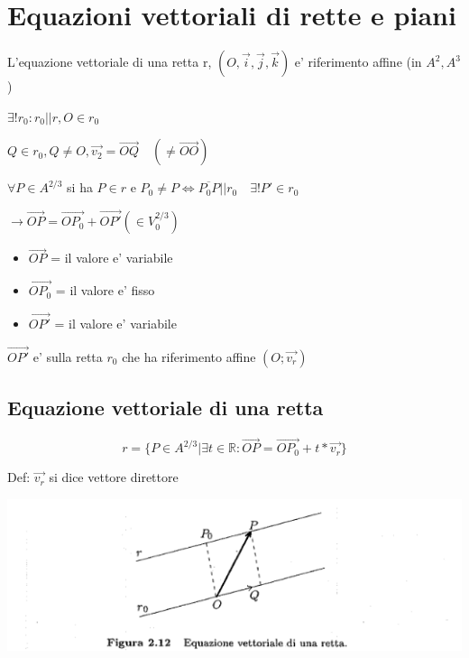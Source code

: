\documentclass{article}
\begin{document}
\section{Equazioni vettoriali di rette e piani}
\begin{flushleft}
	L'equazione vettoriale di una retta r,
	$(O,\overrightarrow{i},\overrightarrow{j},\overrightarrow{k})$ e' riferimento affine (in $A^2,A^3$)
\end{flushleft}
\begin{flushleft}
	$\exists ! r_0 : r_0 || r, O \in r_0$
\end{flushleft}
\begin{flushleft}
	$ Q \in r_0, Q \neq O, \overrightarrow{v_2}=\overrightarrow{OQ} \quad (\neq \overrightarrow{OO})$
\end{flushleft}
\begin{flushleft}
	$\forall P \in A^{2/3}$ si ha $ P \in r$ e $P_0 \neq P \iff \overline{P_0 P} || r_0 \quad \exists ! P' \in r_0$
\end{flushleft}
\begin{flushleft}
	$\to \overrightarrow{OP} = \overrightarrow{OP_0} + \overrightarrow{OP'} (\in V_0^{2/3})$
\end{flushleft}
\begin{itemize}
	\item $\overrightarrow{OP}$ = il valore e' variabile
	\item $\overrightarrow{OP_0}$ = il valore e' fisso
	\item $\overrightarrow{OP'}$ = il valore e' variabile
\end{itemize}
\begin{flushleft}
	$\overrightarrow{OP'}$ e' sulla retta $r_0$ che ha riferimento affine $(O;\overrightarrow{v_r})$
\end{flushleft}
\subsection*{Equazione vettoriale di una retta}
\begin{equation*}
	r = \{ P \in A^{2/3} | \exists t \in \mathbb{R}: \overrightarrow{OP}=\overrightarrow{OP_0}+t*\overrightarrow{v_r} \}
\end{equation*}
\begin{flushleft}
	Def:  $\overrightarrow{v_r}$ si dice vettore direttore
\end{flushleft}
\includegraphics[bb=0 0 350 100]{equazione-retta-v.png}
\end{document}
